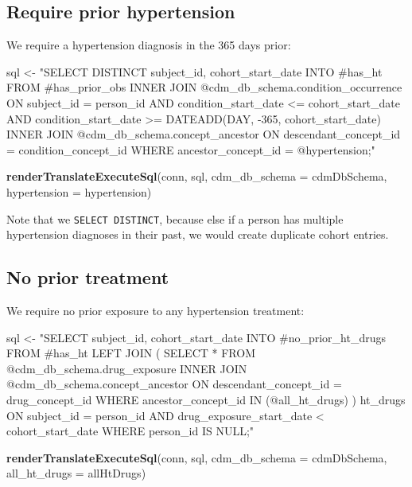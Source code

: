 \documentclass[11pt]{book}
\newenvironment{Shaded}{\begin{snugshade}}{\end{snugshade}}
\newcommand{\DataTypeTok}[1]{\textcolor[rgb]{0.13,0.29,0.53}{#1}}
\newcommand{\KeywordTok}[1]{\textcolor[rgb]{0.13,0.29,0.53}{\textbf{#1}}}
\newcommand{\NormalTok}[1]{#1}
\newcommand{\StringTok}[1]{\textcolor[rgb]{0.31,0.60,0.02}{#1}}
\theoremstyle{definition}
\theoremstyle{definition}
\theoremstyle{definition}
\theoremstyle{remark}
\begin{document}
\hypertarget{require-prior-hypertension}{%
\subsection{Require prior hypertension}\label{require-prior-hypertension}}

We require a hypertension diagnosis in the 365 days prior:

\begin{Shaded}
\begin{Highlighting}[]
\NormalTok{sql <-}\StringTok{ "SELECT DISTINCT subject_id,}
\StringTok{  cohort_start_date}
\StringTok{INTO #has_ht}
\StringTok{FROM #has_prior_obs}
\StringTok{INNER JOIN @cdm_db_schema.condition_occurrence}
\StringTok{  ON subject_id = person_id}
\StringTok{    AND condition_start_date <= cohort_start_date}
\StringTok{    AND condition_start_date >= DATEADD(DAY, -365, cohort_start_date)}
\StringTok{INNER JOIN @cdm_db_schema.concept_ancestor}
\StringTok{  ON descendant_concept_id = condition_concept_id}
\StringTok{WHERE ancestor_concept_id = @hypertension;"}

\KeywordTok{renderTranslateExecuteSql}\NormalTok{(conn, }
\NormalTok{                          sql, }
                          \DataTypeTok{cdm_db_schema =}\NormalTok{ cdmDbSchema, }
                          \DataTypeTok{hypertension =}\NormalTok{ hypertension)}
\end{Highlighting}
\end{Shaded}

Note that we \texttt{SELECT\ DISTINCT}, because else if a person has multiple hypertension diagnoses in their past, we would create duplicate cohort entries.

\hypertarget{no-prior-treatment}{%
\subsection{No prior treatment}\label{no-prior-treatment}}

We require no prior exposure to any hypertension treatment:

\begin{Shaded}
\begin{Highlighting}[]
\NormalTok{sql <-}\StringTok{ "SELECT subject_id,}
\StringTok{  cohort_start_date}
\StringTok{INTO #no_prior_ht_drugs}
\StringTok{FROM #has_ht}
\StringTok{LEFT JOIN (}
\StringTok{  SELECT *}
\StringTok{  FROM @cdm_db_schema.drug_exposure}
\StringTok{  INNER JOIN @cdm_db_schema.concept_ancestor}
\StringTok{    ON descendant_concept_id = drug_concept_id}
\StringTok{  WHERE ancestor_concept_id IN (@all_ht_drugs)}
\StringTok{) ht_drugs}
\StringTok{  ON subject_id = person_id}
\StringTok{    AND drug_exposure_start_date < cohort_start_date}
\StringTok{WHERE person_id IS NULL;"}

\KeywordTok{renderTranslateExecuteSql}\NormalTok{(conn, }
\NormalTok{                          sql, }
                          \DataTypeTok{cdm_db_schema =}\NormalTok{ cdmDbSchema, }
                          \DataTypeTok{all_ht_drugs =}\NormalTok{ allHtDrugs)}
\end{Highlighting}
\end{Shaded}
\end{document}
